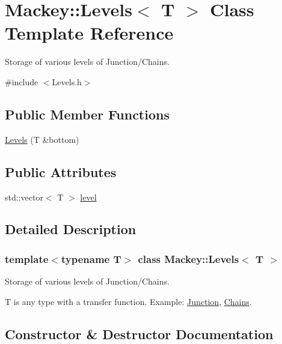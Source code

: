 \hypertarget{classMackey_1_1Levels}{}\section{Mackey\+:\+:Levels$<$ T $>$ Class Template Reference}
\label{classMackey_1_1Levels}


Storage of various levels of Junction/\+Chains.  




{\ttfamily \#include $<$Levels.\+h$>$}

\subsection*{Public Member Functions}
\begin{DoxyCompactItemize}
\item 
\hyperlink{classMackey_1_1Levels_a450b9aba828f03dd340e89169a4bd9e0}{Levels} (T \&bottom)
\end{DoxyCompactItemize}
\subsection*{Public Attributes}
\begin{DoxyCompactItemize}
\item 
std\+::vector$<$ T $>$ \hyperlink{classMackey_1_1Levels_af9a1391f683685ae464829b9b32162c8}{level}
\end{DoxyCompactItemize}


\subsection{Detailed Description}
\subsubsection*{template$<$typename T$>$\newline
class Mackey\+::\+Levels$<$ T $>$}

Storage of various levels of Junction/\+Chains. 

T is any type with a transfer function. Example\+: \hyperlink{classMackey_1_1Junction}{Junction}, \hyperlink{classMackey_1_1Chains}{Chains}. 

\subsection{Constructor \& Destructor Documentation}
\mbox{\label{classMackey_1_1Levels_a450b9aba828f03dd340e89169a4bd9e0}} 
